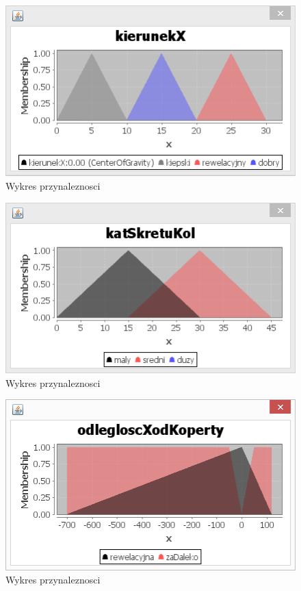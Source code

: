 \documentclass{classrep}
\begin{document}
\begin{figure}[ht]
\centering
			\includegraphics[scale=1.00]{pictures/Obraz06.png}
	\caption{Wykres przynaleznosci}
	\label{fig:Wykres przynaleznosci}
\end{figure}

\begin{figure}[ht]
\centering
			\includegraphics[scale=1.00]{pictures/Obraz07.png}
	\caption{Wykres przynaleznosci}
	\label{fig:Wykres przynaleznosci}
\end{figure}

\begin{figure}[ht]
\centering
			\includegraphics[scale=1.00]{pictures/Obraz08.png}
	\caption{Wykres przynaleznosci}
	\label{fig:Wykres przynaleznosci}
\end{figure}
\end{document}
